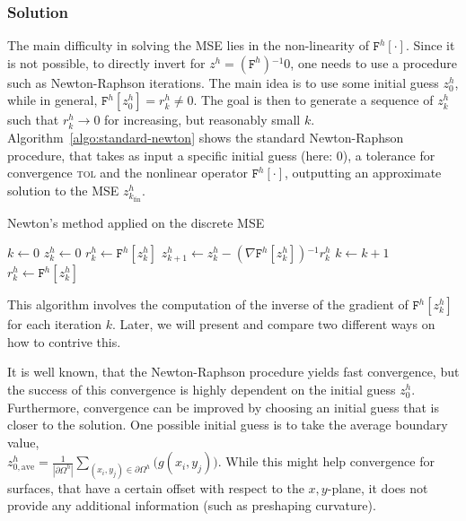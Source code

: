 \documentclass[11pt]{scrartcl}
\newcommand{\mSurfDisc}[1]{\ensuremath{\mathtt{F}^h\left[#1\right]}}
\newcommand{\inv}{\ensuremath{^{-1}}}
\begin{document}
\subsubsection{Solution}
The main difficulty in solving the MSE lies in the non-linearity of $\mSurfDisc{\cdot}$. Since it is not possible, to directly invert for $z^h = \left(\mathtt{F}^h\right)\inv 0$, one needs to use a procedure such as Newton-Raphson iterations. The main idea is to use some initial guess $z^h_0$, while in general, $\mSurfDisc{z^h_0}=r^h_k\neq0$. The goal is then to generate a sequence of $z^h_k$ such that $r^h_k\to 0$ for increasing, but reasonably small $k$. Algorithm~\ref{algo:standard-newton} shows the standard Newton-Raphson procedure, that takes as input a specific initial guess (here: 0), a tolerance for convergence \textsc{tol} and the nonlinear operator $\mSurfDisc{\cdot}$, outputting an approximate solution to the MSE $z^h_{k_\text{fin}}$.
\begin{algorithm}
	\caption{Newton's method applied on the discrete MSE}\label{algo:standard-newton}
	\begin{algorithmic}
		\State $k \gets 0$ 
		\State $z^h_k \gets 0 $ 
		\State $r^h_k \gets \mSurfDisc{z^h_k}$
		 
			\State $z^h_{k+1} \gets z^h_{k} - \left(\nabla\mSurfDisc{z^h_k}\right)\inv r^h_k $
			\State $k \gets k+1$ 
			\State $r^h_k \gets \mSurfDisc{z^h_k}$
		\EndWhile
	\end{algorithmic}
\end{algorithm}

This algorithm involves the computation of the inverse of the gradient of $\mSurfDisc{z^h_k}$ for each iteration $k$. Later, we will present and compare two different ways on how to contrive this.

It is well known, that the Newton-Raphson procedure yields fast convergence, but the success of this convergence is highly dependent on the initial guess $z^h_0$. Furthermore, convergence can be improved by choosing an initial guess that is closer to the solution. 
One possible initial guess is to take the average boundary value, \\$z^h_{0,\text{ave}}=\frac{1}{|\partial\Omega^h|} \sum_{(x_i,y_j)\in \partial\Omega^h} \big(g(x_i,y_j)\big)$. While this might help convergence for surfaces, that have a certain offset with respect to the $x,y$-plane, it does not provide any additional information (such as preshaping curvature).
\end{document}
